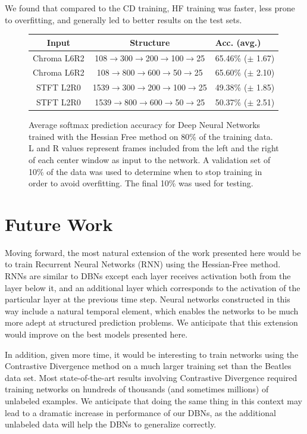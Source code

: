 \documentclass{article}
\begin{document}
We found that compared to the CD training, HF training was faster, less prone
to overfitting, and generally led to better results on the test sets.

\begin{figure}
  \begin{center}
\begin{tabular}{c|c|l}
Input & Structure & Acc. (avg.) \\
\hline
Chroma L6R2 & 108$\rightarrow$300$\rightarrow$200$\rightarrow$100$\rightarrow$25 & 65.46\% ($\pm$ 1.67) \\
Chroma L6R2 & 108$\rightarrow$800$\rightarrow$600$\rightarrow$50$\rightarrow$25 & 65.60\% ($\pm$ 2.10) \\
STFT L2R0 & 1539$\rightarrow$300$\rightarrow$200$\rightarrow$100$\rightarrow$25 & 49.38\% ($\pm$ 1.85) \\
STFT L2R0 & 1539$\rightarrow$800$\rightarrow$600$\rightarrow$50$\rightarrow$25 & 50.37\% ($\pm$ 2.51) \\
\end{tabular}
\end{center}
\caption{
  Average softmax prediction accuracy for Deep Neural Networks trained with the
  Hessian Free method on 80\% of the training data. L and R values represent
  frames included from the left and the right of each center window as input to
  the network. A validation set of 10\% of the data was used to determine when
  to stop training in order to avoid overfitting. The final 10\% was used for
  testing.
}
\label{fig:hf:softmax}
\end{figure}

\section{Future Work}
\label{sec:future_work}

Moving forward, the most natural extension of the work presented here would be
to train Recurrent Neural Networks (RNN) using the Hessian-Free method. RNNs
are similar to DBNs except each layer receives activation both from the layer
below it, and an additional layer which corresponds to the activation of the
particular layer at the previous time step. Neural networks constructed in this
way include a natural temporal element, which enables the networks to be much
more adept at structured prediction problems. We anticipate that this extension
would improve on the best models presented here.

In addition, given more time, it would be interesting to train networks using
the Contrastive Divergence method on a much larger training set than the
Beatles data set. Most state-of-the-art results involving Contrastive
Divergence required training networks on hundreds of thousands (and sometimes
millions) of unlabeled examples. We anticipate that doing the same thing in
this context may lead to a dramatic increase in performance of our DBNs, as the
additional unlabeled data will help the DBNs to generalize correctly.

\newpage



\end{document}

